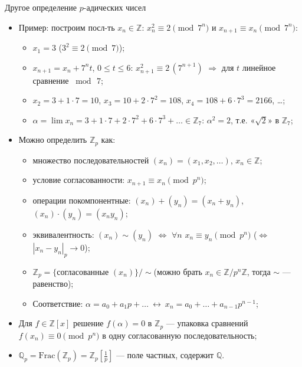 \documentclass[serif, aspectratio=169]{beamer}
\newcommand{\sagemark}{%
  \textcolor{green!40!black}{\textbf{\texttt{sage:...}}}%
}
\begin{document}
\begin{frame}{Другое определение $p$-адических чисел}
    \begin{itemize}
        \item Пример: построим посл-ть $x_n\in\mathbb{Z}$: $x_n^2\equiv2\pmod{7^n}$ и $x_{n+1}\equiv x_n\pmod{7^n}$:
        \begin{itemize}
            \item $x_1=3$ ($3^2\equiv2\pmod 7$);
            \item $x_{n+1}=x_n+7^nt$, $0\leqslant t\leqslant6$: $x_{n+1}^2\equiv2\,(7^{n+1})$ $\Rightarrow$ для $t$ линейное сравнение $\bmod\, 7$;
            \item $x_2=3+1\cdot7=10$, $x_3=10+2\cdot7^2=108$, $x_4=108+6\cdot7^3=2166$, \dots;
            \item $\alpha=\lim x_n=3+1\cdot7+2\cdot7^2+6\cdot7^3+\dots\in\mathbb{Z}_7$: $\alpha^2=2$, т.е. «$\sqrt2$» в $\mathbb{Z}_7$;
        \end{itemize}
        \item Можно определить $\mathbb{Z}_p$ как:
        \begin{itemize}
            \item множество последовательностей $(x_n)=(x_1,x_2,\dots)$, $x_n\in\mathbb{Z}$;
            \item условие согласованности: $x_{n+1}\equiv x_n\pmod{p^n}$;
            \item операции покомпонентные: $(x_n)+(y_n)=(x_n+y_n)$, $(x_n)\cdot(y_n)=(x_n y_n)$;
            \item эквивалентность: $(x_n)\sim(y_n)$ $\Leftrightarrow$ $\forall n$ $x_n\equiv y_n\pmod{p^n}$ ($\Leftrightarrow$ $|x_n-y_n|_p\to0$);
            \item $\mathbb{Z}_p=\{\text{согласованные }(x_n)\}/{\sim}$\quad (можно брать $x_n\in\mathbb{Z}/p^n\mathbb{Z}$, тогда $\sim$ --- равенство);
            \item Соответствие: $\alpha=a_0+a_1p+\dots\ \leftrightarrow\ x_n=a_0+\dots+a_{n-1}p^{n-1}$;
        \end{itemize}
        \item Для $f\in\mathbb{Z}[x]$ решение $f(\alpha)=0$ в $\mathbb{Z}_p$ --- упаковка сравнений $f(x_n)\equiv0\pmod{p^n}$ в одну согласованную последовательность;
        \item $\mathbb{Q}_p=\mathrm{Frac}(\mathbb{Z}_p)=\mathbb{Z}_p[\tfrac1p]$ --- поле частных, содержит $\mathbb{Q}$.
    \end{itemize}
    
    \note{
        \begin{itemize}
            \item ---
        \end{itemize}
    }
\end{frame}
\end{document}
